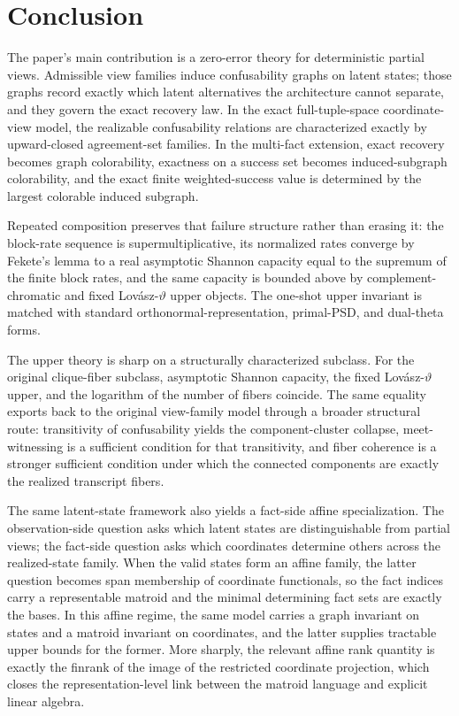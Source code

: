 \section{Conclusion}\label{sec:conclusion}

The paper's main contribution is a zero-error theory for deterministic partial views. Admissible view families induce confusability graphs on latent states; those graphs record exactly which latent alternatives the architecture cannot separate, and they govern the exact recovery law. In the exact full-tuple-space coordinate-view model, the realizable confusability relations are characterized exactly by upward-closed agreement-set families. In the multi-fact extension, exact recovery becomes graph colorability, exactness on a success set becomes induced-subgraph colorability, and the exact finite weighted-success value is determined by the largest colorable induced subgraph.

Repeated composition preserves that failure structure rather than erasing it: the block-rate sequence is supermultiplicative, its normalized rates converge by Fekete's lemma to a real asymptotic Shannon capacity equal to the supremum of the finite block rates, and the same capacity is bounded above by complement-chromatic and fixed Lov\'asz-$\vartheta$ upper objects. The one-shot upper invariant is matched with standard orthonormal-representation, primal-PSD, and dual-theta forms.

The upper theory is sharp on a structurally characterized subclass. For the original clique-fiber subclass, asymptotic Shannon capacity, the fixed Lov\'asz-$\vartheta$ upper, and the logarithm of the number of fibers coincide. The same equality exports back to the original view-family model through a broader structural route: transitivity of confusability yields the component-cluster collapse, meet-witnessing is a sufficient condition for that transitivity, and fiber coherence is a stronger sufficient condition under which the connected components are exactly the realized transcript fibers.

The same latent-state framework also yields a fact-side affine specialization. The observation-side question asks which latent states are distinguishable from partial views; the fact-side question asks which coordinates determine others across the realized-state family. When the valid states form an affine family, the latter question becomes span membership of coordinate functionals, so the fact indices carry a representable matroid and the minimal determining fact sets are exactly the bases. In this affine regime, the same model carries a graph invariant on states and a matroid invariant on coordinates, and the latter supplies tractable upper bounds for the former. More sharply, the relevant affine rank quantity is exactly the finrank of the image of the restricted coordinate projection, which closes the representation-level link between the matroid language and explicit linear algebra.

